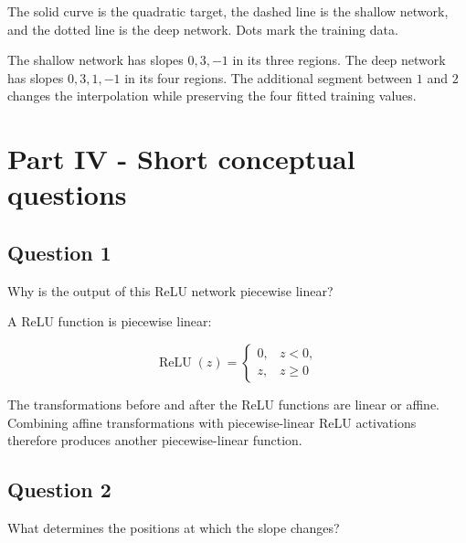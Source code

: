 \documentclass[10pt]{article}
\begin{document}
The solid curve is the quadratic target, the dashed line is the shallow network, and the dotted line is the deep network. Dots mark the training data.
\begin{center}
\end{center}
The shallow network has slopes $0,3,-1$ in its three regions. The deep network has slopes $0,3,1,-1$ in its four regions. The additional segment between $1$ and $2$ changes the interpolation while preserving the four fitted training values.
\par\endgroup

\clearpage
\section*{Part IV - Short conceptual questions}
\subsection*{Question 1}
Why is the output of this ReLU network piecewise linear?

\begingroup\color{red}

A ReLU function is piecewise linear:

\[
\operatorname{ReLU}(z)=
\begin{cases}
0, & z<0,\\
z, & z\geq0
\end{cases}
\]

The transformations before and after the ReLU functions are linear or affine. Combining affine transformations with piecewise-linear ReLU activations therefore produces another piecewise-linear function.

\par\endgroup

\subsection*{Question 2}
What determines the positions at which the slope changes?
\end{document}
